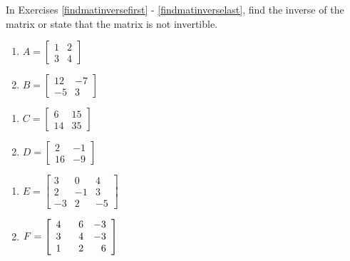In Exercises \ref{findmatinversefirst} - \ref{findmatinverselast}, find the inverse of the matrix or state that the matrix is not invertible.

\begin{multicols}{2}
\begin{enumerate}

\item $A = \left[ \begin{array}{rr} 1 & 2 \\ 3 & 4 \end{array} \right]$ \label{findmatinversefirst}
\item $B = \left[ \begin{array}{rr} 12 & -7 \\ -5 & 3 \end{array} \right]$ \label{matrixB}

\setcounter{HW}{\value{enumi}}
\end{enumerate}
\end{multicols}

\begin{multicols}{2}
\begin{enumerate}
\setcounter{enumi}{\value{HW}}

\item $C = \left[ \begin{array}{rr} 6 & 15 \\ 14 & 35 \end{array} \right]$
\item $D = \left[ \begin{array}{rr} 2 & -1 \\ 16 & -9 \end{array} \right]$ \label{matrixD}

\setcounter{HW}{\value{enumi}}
\end{enumerate}
\end{multicols}

\begin{multicols}{2}
\begin{enumerate}
\setcounter{enumi}{\value{HW}}

\item $E = \left[ \begin{array}{rrr} 3 & 0 & 4 \\ 2 & -1 & 3 \\ -3 & 2 & -5 \end{array} \right]$ \label{matrixE}
\item $F = \left[ \begin{array}{rrr} 4 & \hphantom{-}6 & -3 \\ 3 & 4 & -3 \\ 1 & 2 & 6 \end{array} \right]$

\setcounter{HW}{\value{enumi}}
\end{enumerate}
\end{multicols}

